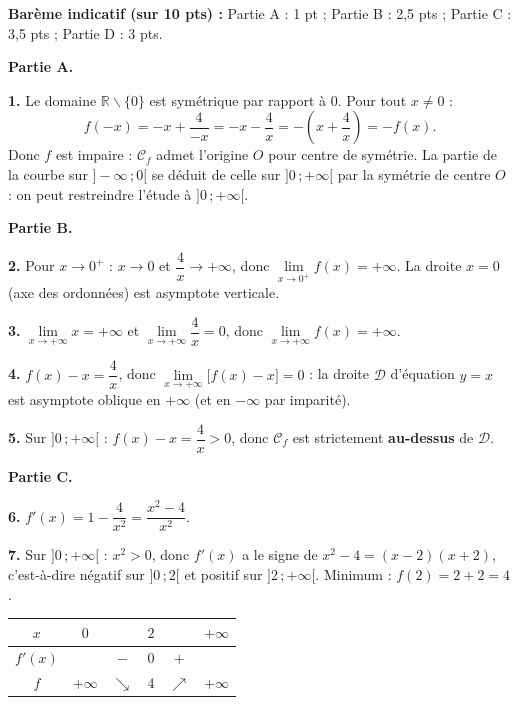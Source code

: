 \documentclass[11pt]{article}
\newcommand{\cle}[1]{{\popxbold\color{popdark}#1}}
\def\setminus{\mathbin{\backslash}}\let\smallsetminus\setminus
\begin{document}
\begin{corrige}
\textbf{Barème indicatif (sur 10 pts) :} Partie A : 1 pt ; Partie B : 2,5 pts ; Partie C : 3,5 pts ; Partie D : 3 pts.

\textbf{Partie A.}

\textbf{1.} Le domaine $\mathbb{R}\setminus\{0\}$ est symétrique par rapport à $0$. Pour tout $x\neq 0$ :
\[ f(-x)=-x+\frac{4}{-x}=-x-\frac{4}{x}=-\left(x+\frac{4}{x}\right)=-f(x). \]
Donc $f$ est \cle{impaire} : $\mathcal{C}_f$ admet l'origine $O$ pour \cle{centre de symétrie}. La partie de la courbe sur $]-\infty\,;0[$ se déduit de celle sur $]0\,;+\infty[$ par la symétrie de centre $O$ : on peut restreindre l'étude à $]0\,;+\infty[$.

\textbf{Partie B.}

\textbf{2.} Pour $x\to 0^+$ : $x\to 0$ et $\dfrac{4}{x}\to +\infty$, donc $\lim\limits_{x\to 0^+}f(x)=+\infty$. La droite $\boxed{x=0}$ (axe des ordonnées) est \cle{asymptote verticale}.

\textbf{3.} $\lim\limits_{x\to+\infty}x=+\infty$ et $\lim\limits_{x\to+\infty}\dfrac4x=0$, donc $\lim\limits_{x\to+\infty}f(x)=+\infty$.

\textbf{4.} $f(x)-x=\dfrac{4}{x}$, donc $\lim\limits_{x\to+\infty}\bigl[f(x)-x\bigr]=0$ : la droite $\mathcal{D}$ d'équation $\boxed{y=x}$ est \cle{asymptote oblique} en $+\infty$ (et en $-\infty$ par imparité).

\textbf{5.} Sur $]0\,;+\infty[$ : $f(x)-x=\dfrac{4}{x}>0$, donc $\mathcal{C}_f$ est strictement \textbf{au-dessus} de $\mathcal{D}$.

\textbf{Partie C.}

\textbf{6.} $f'(x)=1-\dfrac{4}{x^2}=\dfrac{x^2-4}{x^2}$.

\textbf{7.} Sur $]0\,;+\infty[$ : $x^2>0$, donc $f'(x)$ a le signe de $x^2-4=(x-2)(x+2)$, c'est-à-dire négatif sur $]0\,;2[$ et positif sur $]2\,;+\infty[$. Minimum : $f(2)=2+2=4$.

\begin{center}
\begin{tabular}{|c|ccccc|}\hline
$x$ & $0$ & & $2$ & & $+\infty$ \\ \hline
$f'(x)$ & & $-$ & $0$ & $+$ & \\ \hline
$f$ & $+\infty$ & $\searrow$ & $4$ & $\nearrow$ & $+\infty$ \\ \hline
\end{tabular}
\end{center}


\end{corrige}
\end{document}
